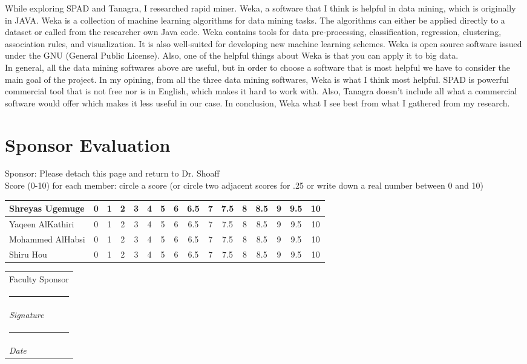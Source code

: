 \documentclass[11pt]{article}
\makeatletter
\newcommand{\namesigdate}[2][5cm]{%
  \begin{tabular}{@{}p{#1}@{}}
    #2 \\[2\normalbaselineskip] \hrule \\[0pt]
    {\small \textit{Signature}} \\ [2\normalbaselineskip] \hrule \\[0pt]
    {\small \textit{Date}}
  \end{tabular}
}
\makeatother
\begin{document}
\hfil \break
While exploring SPAD and Tanagra, I researched rapid miner. Weka, a software that I think is helpful in data mining, which is originally in JAVA. Weka is a collection of machine learning algorithms for data mining tasks. The algorithms can either be applied directly to a dataset or called from the researcher own Java code. Weka contains tools for data pre-processing, classification, regression, clustering, association rules, and visualization. It is also well-suited for developing new machine learning schemes. Weka is open source software issued under the GNU (General Public License). Also, one of the helpful things about Weka is that you can apply it to big data. \\
\hfill \break
In general, all the data mining softwares above are useful, but in order to choose a software that is most helpful we have to consider the main goal of the project. In my opining, from all the three data mining softwares, Weka is what I think most helpful. SPAD is powerful commercial tool that is not free nor is in English, which makes it hard to work with. Also, Tanagra doesn’t include all what a commercial software would offer which makes it less useful in our case. In conclusion, Weka what I see best from what I gathered from my research. 

	\pagebreak
	\section{Sponsor Evaluation}
	Sponsor: Please detach this page and return to Dr. Shoaff \\ \hfill \break 
	Score (0-10) for each member: circle a score (or circle two adjacent scores for .25 or write down a real number between 0 and 10) \\ \hfill \break
	\begin{tabularx}{\textwidth}{|X|c|c|c|c|c|c|c|c|c|c|c|c|c|c|c|}
	\hline
	Shreyas Ugemuge & 0 & 1 &  2 & 3 & 4 & 5 & 6 & 6.5 & 7 & 7.5 & 8 & 8.5 & 9 & 9.5 & 10 \\ \hline
	Yaqeen AlKathiri & 0 & 1 &  2 & 3 & 4 & 5 & 6 & 6.5 & 7 & 7.5 & 8 & 8.5 & 9 & 9.5 & 10 \\ \hline
	Mohammed AlHabsi & 0 & 1 &  2 & 3 & 4 & 5 & 6 & 6.5 & 7 & 7.5 & 8 & 8.5 & 9 & 9.5 & 10 \\ \hline
	Shiru Hou & 0 & 1 &  2 & 3 & 4 & 5 & 6 & 6.5 & 7 & 7.5 & 8 & 8.5 & 9 & 9.5 & 10 \\ 
	\hline 
	\end{tabularx}
	\hfil \break
	\hfil \break
	\namesigdate{Faculty Sponsor}
	
\end{document}

